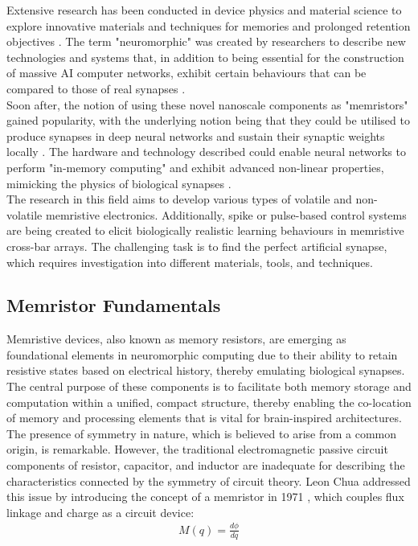 Extensive research has been conducted in device physics and material science to explore innovative materials and techniques for memories and prolonged retention objectives \cite{indiveri2021introducing}. The term "neuromorphic" was created by researchers to describe new technologies and systems that, in addition to being essential for the construction of massive AI computer networks, exhibit certain behaviours that can be compared to those of real synapses \cite{di2009circuit}. \\

\noindent Soon after, the notion of using these novel nanoscale components as "memristors" gained popularity, with the underlying notion being that they could be utilised to produce synapses in deep neural networks and sustain their synaptic weights locally \cite{jo2010nanoscale}. The hardware and technology described could enable neural networks to perform "in-memory computing" and exhibit advanced non-linear properties, mimicking the physics of biological synapses \cite{saighi2015plasticity}. \\

\noindent The research in this field aims to develop various types of volatile and non-volatile memristive electronics. Additionally, spike or pulse-based control systems are being created to elicit biologically realistic learning behaviours in memristive cross-bar arrays. The challenging task is to find the perfect artificial synapse, which requires investigation into different materials, tools, and techniques.

\subsection[Memristor Fundamentals]{Memristor Fundamentals}

Memristive devices, also known as memory resistors, are emerging as foundational elements in neuromorphic computing due to their ability to retain resistive states based on electrical history, thereby emulating biological synapses. The central purpose of these components is to facilitate both memory storage and computation within a unified, compact structure, thereby enabling the co-location of memory and processing elements that is vital for brain-inspired architectures.\\

\noindent The presence of symmetry in nature, which is believed to arise from a common origin, is remarkable.  However, the traditional electromagnetic passive circuit components of resistor, capacitor, and inductor are inadequate for describing the characteristics connected by the symmetry of circuit theory. Leon Chua addressed this issue by introducing the concept of a memristor in 1971 \cite{chua1971memristor}, which couples flux linkage and charge as a circuit device:
\begin{align}
    M(q) = \frac{d\phi}{dq} \label{eq:1.22}
\end{align}

